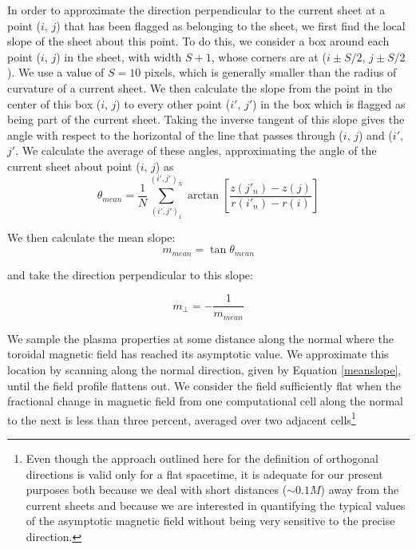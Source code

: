In order to approximate the direction perpendicular to
the current sheet at a point ($i$, $j$) that has been flagged
as belonging to the sheet, we first find the local slope of
the sheet about this point. To do this, we consider a box
around each point ($i$, $j$) in the sheet, with width $S+1$,
whose corners are at ($i \pm S/2$, $j \pm S/2$). We use a value
of $S = 10$ pixels, which is generally smaller than the
radius of curvature of a current sheet. We then calculate
the slope from the point in the center of this box ($i$, $j$)
to every other point ($i'$, $j'$)
in the box which is flagged
as being part of the current sheet. Taking the inverse
tangent of this slope gives the angle with respect to the
horizontal of the line that passes through ($i$, $j$) and ($i'$,$j'$.
We calculate the average of these angles, approximating
the angle of the current sheet about point ($i$, $j$) as
\begin{equation}
\theta_{mean}=\frac{1}{N}\sum_{\left(i',j'\right)_{1}}^{\left(i',j'\right)_{N}}\arctan{\left[\frac{z(j'_n)-z(j)}{r(i'_{n})-r(i)}\right]}
\end{equation}

We then calculate the mean slope:
\begin{equation}
m_{mean}=\tan{\theta_{mean}}
\end{equation}

and take the direction perpendicular to this slope:

\begin{equation}
m_{\perp}=-\frac{1}{m_{mean}}
\label{meanslope}
\end{equation}

We sample the plasma properties at some distance
along the normal where the toroidal magnetic field has
reached its asymptotic value. We approximate this location by scanning along the normal direction, given by
Equation \ref{meanslope}, until the field profile flattens out. We consider the field sufficiently flat when the fractional change
in magnetic field from one computational cell along the
normal to the next is less than three percent, averaged over two adjacent cells\footnote{Even though the approach outlined here for the definition of orthogonal directions is valid only for a flat spacetime, it is adequate for our present purposes both because we deal with short distances ($\sim 0.1 M$) away from the current sheets and because we are interested in quantifying the typical values of the asymptotic magnetic field without being very sensitive to the precise direction.}

